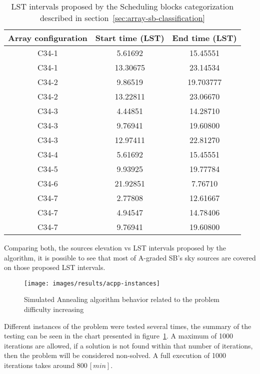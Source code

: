 \begin{table}[htbp]
\begin{center}
\begin{tabular}{|c|c|c|}
\hline
Array configuration & Start time (LST) & End time (LST) \\ \hline
C34-1 & 5.61692 & 15.45551 \\ \hline
C34-1 & 13.30675 & 23.14534 \\ \hline
C34-2 & 9.86519 & 19.703777 \\ \hline
C34-2 & 13.22811 & 23.06670 \\ \hline
C34-3 & 4.44851 & 14.28710 \\ \hline
C34-3 & 9.76941 & 19.60800 \\ \hline
C34-3 & 12.97411 & 22.81270 \\ \hline
C34-4 & 5.61692 & 15.45551 \\ \hline
C34-5 & 9.93925 & 19.77784 \\ \hline
C34-6 & 21.92851 & 7.76710 \\ \hline
C34-7 & 2.77808 & 12.61667 \\ \hline
C34-7 & 4.94547 & 14.78406 \\ \hline
C34-7 & 9.76941 & 19.60800 \\ \hline
\end{tabular}
\end{center}
\caption[LST intervals proposed by the Scheduling Blocks categorization]
{LST intervals proposed by the Scheduling blocks categorization described in section~\ref{sec:array-sb-classification}}
\label{table:lst-int-prop}
\end{table}

Comparing both, the sources elevation vs LST intervals proposed by the algorithm, it is possible to see that most of A-graded SB's sky sources are covered on those proposed LST intervals.

\begin{figure}[htbp]
\begin{center}
\texttt{[image: images/results/acpp-instances]}
\end{center}
\caption{Simulated Annealing algorithm behavior related to the problem difficulty increasing}
\label{fig:acpp-behavior}
\end{figure}

Different instances of the problem were tested several times, the summary of the testing can be seen in the chart presented in figure~\ref{fig:acpp-behavior}. A maximum of 1000 iterations are allowed, if a solution is not found within that number of iterations, then the problem will be considered non-solved. A full execution of 1000 iterations takes around $800\,[min]$.



